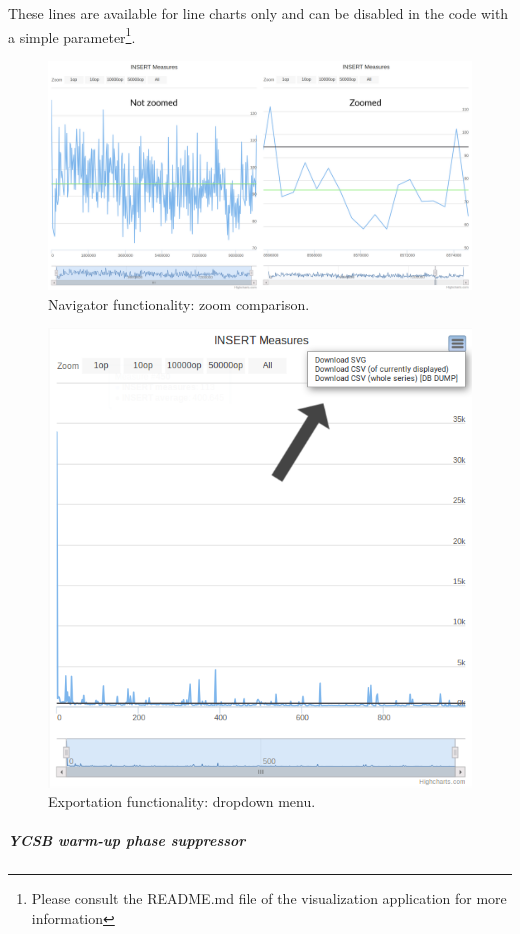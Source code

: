 \documentclass[a4paper,11pt]{report}
\begin{document}
These lines are available for line charts only and can be disabled in the code with a simple parameter\footnote{Please consult the README.md file of the visualization application for more information}.

\begin{figure}[ht]
\begin{center}
\includegraphics[width=1\linewidth]{images/chart_not_zoomed_zoomed.png}
\caption{Navigator functionality: zoom comparison.}
\label{chart_not_zoomed_zoomed}
\end{center}
\end{figure}

\begin{figure}[ht]
\begin{center}
\includegraphics[width=0.6\linewidth]{images/chart_exportation.png}
\caption{Exportation functionality: dropdown menu.}
\label{chart_exportation}
\end{center}
\end{figure}
\clearpage
\subparagraph{YCSB warm-up phase suppressor}
\end{document}
